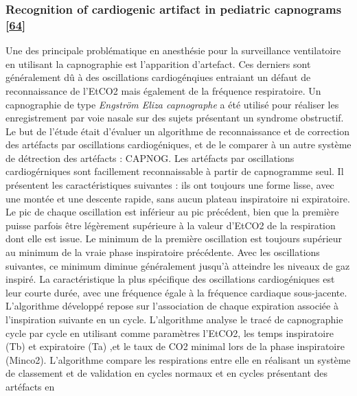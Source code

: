 \documentclass[12pt,]{article}
\begin{document}
\hypertarget{recognition-of-cardiogenic-artifact-in-pediatric-capnograms-smith1994recognition}{%
\subsubsection{\texorpdfstring{Recognition of cardiogenic artifact in
pediatric capnograms
{[}\protect\hyperlink{ref-smith1994recognition}{64}{]}}{Recognition of cardiogenic artifact in pediatric capnograms {[}64{]}}}\label{recognition-of-cardiogenic-artifact-in-pediatric-capnograms-smith1994recognition}}

Une des principale problématique en anesthésie pour la surveillance
ventilatoire en utilisant la capnographie est l'apparition d'artefact.
Ces derniers sont généralement dû à des oscillations cardiogénqiues
entraiant un défaut de reconnaissance de l'EtCO2 mais également de la
fréquence respiratoire. Un capnographie de type \emph{Engström Eliza
capnographe} a été utilisé pour réaliser les enregistrement par voie
nasale sur des sujets présentant un syndrome obstructif. Le but de
l'étude était d'évaluer un algorithme de reconnaissance et de correction
des artéfacts par oscillations cardiogéniques, et de le comparer à un
autre système de détrection des artéfacts : CAPNOG. Les artéfacts par
oscillations cardiogérniques sont facillement reconnaissable à partir de
capnogramme seul. Il présentent les caractéristiques suivantes : ils ont
toujours une forme lisse, avec une montée et une descente rapide, sans
aucun plateau inspiratoire ni expiratoire. Le pic de chaque oscillation
est inférieur au pic précédent, bien que la première puisse parfois être
légèrement supérieure à la valeur d'EtCO2 de la respiration dont elle
est issue. Le minimum de la première oscillation est toujours supérieur
au minimum de la vraie phase inspiratoire précédente. Avec les
oscillations suivantes, ce minimum diminue généralement jusqu'à
atteindre les niveaux de gaz inspiré. La caractéristique la plus
spécifique des oscillations cardiogéniques est leur courte durée, avec
une fréquence égale à la fréquence cardiaque sous-jacente. L'algorithme
développé repose sur l'association de chaque expiration associée à
l'inspiration suivante en un cycle. L'algorithme analyse le tracé de
capnographie cycle par cycle en utilisant comme paramètres l'EtCO2, les
temps inspiratoire (Tb) et expiratoire (Ta) ,et le taux de CO2 minimal
lors de la phase inspiratoire (Minco2). L'algorithme compare les
respirations entre elle en réalisant un système de classement et de
validation en cycles normaux et en cycles présentant des artéfacts en
\end{document}
